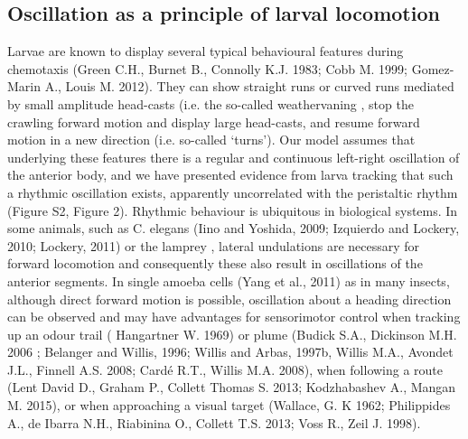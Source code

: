 \documentclass[10pt,a4paper]{article}
\begin{document}
\subsection{Oscillation as a principle of larval locomotion}
Larvae are known to display several typical behavioural features during chemotaxis (Green C.H., Burnet B., Connolly K.J. 1983; Cobb M. 1999; Gomez-Marin A., Louis M. 2012). They can show straight runs or curved runs mediated by small amplitude head-casts (i.e. the so-called weathervaning \cite{iino2009parallel,ohashi2014novel,gomez2014multilevel}, stop the crawling forward motion and display large head-casts, and resume forward motion in a new direction (i.e. so-called ‘turns’). Our model assumes that underlying these features there is a regular and continuous left-right oscillation of the anterior body, and we have presented evidence from larva tracking that such a rhythmic oscillation exists, apparently uncorrelated with the peristaltic rhythm (Figure S2, Figure 2). Rhythmic behaviour is ubiquitous in biological systems. In some animals, such as C. elegans (Iino and Yoshida, 2009; Izquierdo and Lockery, 2010; Lockery, 2011) or the lamprey \citep{lansner1997realistic,wilson1999spikes}, lateral undulations are necessary for forward locomotion and consequently these also result  in oscillations of the anterior segments. In single amoeba cells (Yang et al., 2011) as in many insects, although direct forward motion is possible, oscillation about a heading direction can be observed and may have advantages for sensorimotor control when tracking up an odour trail ( Hangartner W. 1969) or plume (Budick S.A., Dickinson M.H. 2006 ; Belanger and Willis, 1996; Willis and Arbas, 1997b, Willis M.A., Avondet J.L., Finnell A.S. 2008; Cardé R.T., Willis M.A. 2008), when following a route (Lent David D., Graham P., Collett Thomas S. 2013; Kodzhabashev A., Mangan M. 2015), or when approaching a visual target (Wallace, G. K 1962; Philippides A., de Ibarra N.H., Riabinina O., Collett T.S. 2013; Voss R., Zeil J. 1998).
\end{document}

